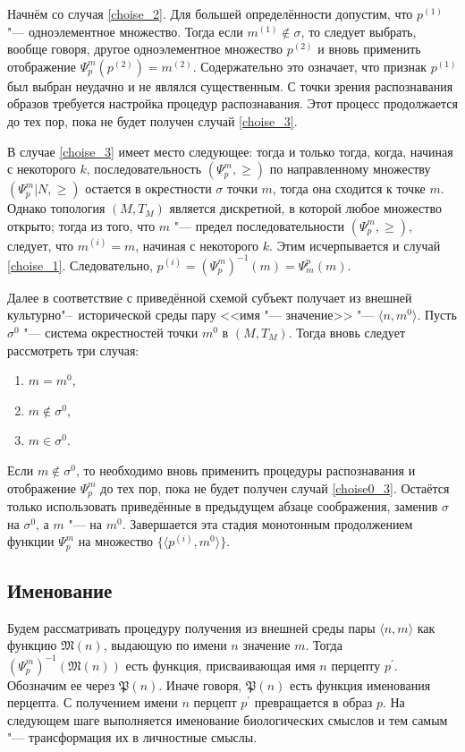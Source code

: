 Начнём со случая \ref{choise_2}. Для большей определённости допустим, что $p^{(1)}$ "--- одноэлементное множество. Тогда если $m^{(1)}\not\in\sigma$, то следует выбрать, вообще говоря, другое одноэлементное множество $p^{(2)}$ и вновь применить отображение $\Psi_p^m(p^{(2)})=m^{(2)}$. Содержательно это означает, что признак $p^{(1)}$ был выбран неудачно и не являлся существенным. С точки зрения распознавания образов требуется настройка процедур распознавания. Этот процесс продолжается до тех пор, пока не будет получен случай \ref{choise_3}.

В случае \ref{choise_3} имеет место следующее: тогда и только тогда, когда, начиная с некоторого $k$, последовательность $(\Psi_p^m,\geqslant)$ по направленному множеству $(\Psi_p^m | N,\geqslant)$ остается в окрестности $\sigma$ точки $m$, тогда она сходится к точке $m$. Однако топология $(M,T_M)$ является дискретной, в которой любое множество открыто; тогда из того, что $m$ "--- предел последовательности $(\Psi_p^m,\geqslant)$, следует, что $m^{(i)}=m$, начиная с некоторого $k$. Этим исчерпывается и случай \ref{choise_1}. Следовательно, $p^{(i)}={(\Psi_p^m)}^{-1}(m)=\Psi_m^p(m)$.

Далее в соответствие с приведённой схемой субъект получает из внешней культурно"--~исторической среды пару <<имя "--- значение>> "--- $\langle n,m^0\rangle$. Пусть $\sigma^0$ "--- система окрестностей точки $m^0$ в $(M,T_M)$. Тогда вновь следует рассмотреть три случая:
\begin{enumerate}
	\item\label{choise0_1} $m=m^0$,
	\item\label{choise0_2} $m\not\in\sigma^0$,
	\item\label{choise0_3} $m\in\sigma^0$.
\end{enumerate}

Если $m\not\in\sigma^0$, то необходимо вновь применить процедуры распознавания и отображение $\Psi_p^m$ до тех пор, пока не будет получен случай \ref{choise0_3}. Остаётся только использовать приведённые в предыдущем абзаце соображения, заменив $\sigma$ на $\sigma^0$, а $m$ "--- на $m^0$. Завершается эта стадия монотонным продолжением функции $\Psi_p^m$ на множество $\{\langle p^{(i)},m^0\rangle\}$.

\subsection{Именование}

Будем рассматривать процедуру получения из внешней среды пары $\langle n,m\rangle$ как функцию $\mathfrak M(n)$, выдающую по имени $n$ значение $m$. Тогда ${(\Psi_p^m)}^{-1}(\mathfrak M(n))$ есть функция, присваивающая имя $n$ перцепту $p^\prime$. Обозначим ее через $\mathfrak P(n)$. Иначе говоря, $\mathfrak P(n)$ есть функция именования перцепта. С получением имени $n$ перцепт $p^\prime$ превращается в образ $p$. На следующем шаге выполняется именование биологических смыслов и тем самым "--- трансформация их в личностные смыслы.

